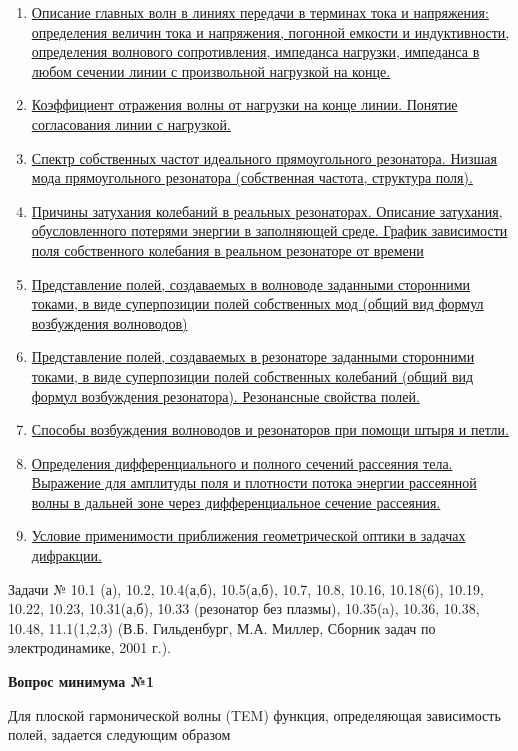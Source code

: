 \documentclass[a4paper,14pt]{extarticle}
\newcommand{\ticket}[1] {
\newpage
\hypertarget{num#1}{}
\begin{center}
	\textbf{Вопрос минимума №#1 }
\end{center}
}
\begin{document}
\begin{enumerate}
	\item
	\hyperlink{num9}{Описание главных волн в линиях передачи в терминах тока и напряжения: определения величин тока и напряжения, погонной емкости и индуктивности, \underline{определения} волнового сопротивления, импеданса нагрузки, импеданса в любом сечении линии с произвольной нагрузкой на конце.}
	\item 
	\hyperlink{num10}{Коэффициент отражения волны от нагрузки на конце линии. Понятие согласования линии с нагрузкой.}
	\item 
	\hyperlink{num11}{Спектр собственных частот идеального прямоугольного резонатора. Низшая мода прямоугольного резонатора (собственная частота, структура поля).}
	\item 
	\hyperlink{num12}{Причины затухания колебаний в реальных резонаторах. Описание затухания, обусловленного потерями энергии в заполняющей среде. График зависимости поля собственного колебания в реальном резонаторе от времени}
	\item 
	\hyperlink{num13}{Представление полей, создаваемых в волноводе заданными сторонними токами, в виде суперпозиции полей собственных мод (общий вид формул возбуждения волноводов)}
	\item 
	\hyperlink{num14}{Представление полей, создаваемых в резонаторе заданными сторонними токами, в виде суперпозиции полей собственных колебаний (общий вид формул возбуждения резонатора). Резонансные свойства полей.}
	\item 
	\hyperlink{num15}{Способы возбуждения волноводов и резонаторов при помощи штыря и петли.}
	\item 
	\hyperlink{num16}{Определения дифференциального и полного сечений рассеяния тела. Выражение для амплитуды поля и плотности потока энергии рассеянной волны в дальней зоне через дифференциальное сечение рассеяния.}
	\item 
	\hyperlink{num17}{Условие применимости приближения геометрической оптики в задачах дифракции.}
	
\end{enumerate}
	
	Задачи № 10.1 (а), 10.2, 10.4(а,б), 10.5(а,б), 10.7, 10.8, 10.16, 10.18(6), 10.19, 10.22, 10.23, 10.31(а,б), 10.33 (резонатор без плазмы), 10.35(a), 10.36, 10.38, 10.48, 11.1(1,2,3)
	(В.Б. Гильденбург, М.А. Миллер, Сборник задач по электродинамике, 2001 г.).

	\ticket{1}
	Для плоской гармонической волны (TEM) функция, определяющая зависимость полей, задается следующим образом 
	
\end{document}
